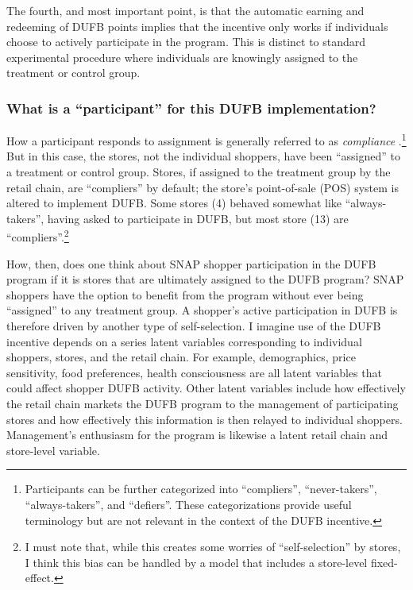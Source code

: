 \documentclass[12pt,letterpaperpaper,]{book}
\begin{document}
The fourth, and most important point, is that the automatic earning and
redeeming of DUFB points implies that the incentive only works if
individuals choose to actively participate in the program. This is
distinct to standard experimental procedure where individuals are
knowingly assigned to the treatment or control group.

\subsubsection*{\texorpdfstring{What is a ``participant'' for this DUFB
implementation?}{What is a participant for this DUFB implementation?}}\label{what-is-a-participant-for-this-dufb-implementation}

How a participant responds to assignment is generally referred to as
\emph{compliance} \citep{angrist_mostly_2008}.\footnote{Participants can
  be further categorized into ``compliers'', ``never-takers'',
  ``always-takers'', and ``defiers''. These categorizations provide
  useful terminology but are not relevant in the context of the DUFB
  incentive.} But in this case, the stores, not the individual shoppers,
have been ``assigned'' to a treatment or control group. Stores, if
assigned to the treatment group by the retail chain, are ``compliers''
by default; the store's point-of-sale (POS) system is altered to
implement DUFB. Some stores (4) behaved somewhat like ``always-takers'',
having asked to participate in DUFB, but most store (13) are
``compliers''.\footnote{I must note that, while this creates some
  worries of ``self-selection'' by stores, I think this bias can be
  handled by a model that includes a store-level fixed-effect.}

How, then, does one think about SNAP shopper participation in the DUFB
program if it is stores that are ultimately assigned to the DUFB
program? SNAP shoppers have the option to benefit from the program
without ever being ``assigned'' to any treatment group. A shopper's
active participation in DUFB is therefore driven by another type of
self-selection. I imagine use of the DUFB incentive depends on a series
latent variables corresponding to individual shoppers, stores, and the
retail chain. For example, demographics, price sensitivity, food
preferences, health consciousness are all latent variables that could
affect shopper DUFB activity. Other latent variables include how
effectively the retail chain markets the DUFB program to the management
of participating stores and how effectively this information is then
relayed to individual shoppers. Management's enthusiasm for the program
is likewise a latent retail chain and store-level variable.
\end{document}
